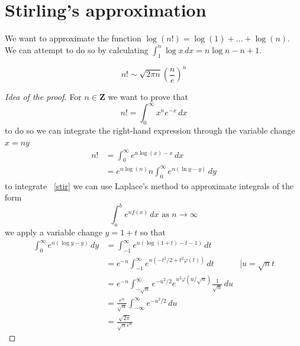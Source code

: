 \section{Stirling's approximation}
We want to approximate the function $\log(n!)=\log(1)+\dots+\log(n)$. We can attempt to do so by calculating $\int_{1}^{n} \log x \, dx=n\log n-n+1$. 
\begin{theorem}
\begin{equation}
  n!\sim \sqrt{ 2\pi n }\left( \frac{n}{e} \right)^{n}\label{stirling}  
\end{equation}
\end{theorem}
\begin{proof}[Idea of the proof]
For $n\in \mathbf{Z}$ we want to prove that  $$n! = \int_{0}^{\infty} x^{n}e^{-x} \, dx$$
to do so we can integrate the right-hand expression through the variable change $x=ny$
\begin{align*}
n! & =\int_{0}^{\infty} e^{n\log(x)-x} \, dx \\
  & =e^{n\log(n)}n\int_{0}^{\infty} e^{n(\ln y-y)} \, dy \tag{\star}\label{stir}
\end{align*} 
to integrate ~\ref{stir} we can use Laplace's method to approximate integrals of the form
$$
\int_{a}^{b} e^{nf(x)} \, dx\text{ as }n\to \infty 
$$
we apply a variable change $y=1+t$ so that
\begin{align*}
\int_{0}^{\infty} e^{n(\log y-y)} \, dy  & =\int_{-1}^{\infty} e^{n(\log(1+t)-t-1)} \, dt \\
  & =e^{-n}\int_{-1}^{\infty}e^{n(-t^{2}/2+t^{2}\varphi(t))}   \, dt & |u=\sqrt{ n }t \\
 & =e^{-n} \int_{-\sqrt{ n }}^{\infty} e^{-u^{2}/2}e^{u^{2}\varphi(u/\sqrt{ n })} \frac{1}{\sqrt{ n }} \, du \\
 & =\frac{e^{n}}{\sqrt{ n }}\int_{-\infty}^{\infty} e^{-u^{2}/2} \, du  \\
 & =\frac{\sqrt{ 2\pi }}{\sqrt{ n }e^{n}}
\end{align*}
\end{proof}


